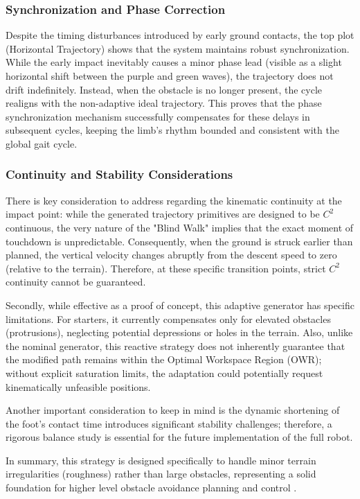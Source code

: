 \subsubsection{Synchronization and Phase Correction}

Despite the timing disturbances introduced by early ground contacts, the top plot (Horizontal Trajectory) shows
that the system maintains robust synchronization. While the early impact inevitably causes a minor phase lead
(visible as a slight horizontal shift between the purple and green waves), the trajectory does not drift
indefinitely. Instead, when the obstacle is no longer present, the cycle realigns with the non-adaptive ideal
trajectory. This proves that the phase synchronization mechanism successfully compensates for these delays in
subsequent cycles, keeping the limb's rhythm bounded and consistent with the global gait cycle.


\subsubsection{Continuity and Stability Considerations}

There is key consideration to address regarding the kinematic continuity at the impact point: while the
generated trajectory primitives are designed to be $C^2$ continuous, the very nature of the "Blind Walk"
implies that the exact moment of touchdown is unpredictable. Consequently, when the ground is struck earlier
than planned, the vertical velocity changes abruptly from the descent speed to zero (relative to the terrain).
Therefore, at these specific transition points, strict $C^2$ continuity cannot be guaranteed.

Secondly, while effective as a proof of concept, this adaptive generator has specific limitations. For starters,
it currently compensates only for elevated obstacles (protrusions), neglecting potential depressions or holes
in the terrain. Also, unlike the nominal generator, this reactive strategy does not inherently guarantee that
the modified path remains within the Optimal Workspace Region (OWR); without explicit saturation limits, the
adaptation could potentially request kinematically unfeasible positions.

Another important consideration to keep in mind is the dynamic shortening of the foot's contact time introduces
significant stability challenges; therefore, a rigorous balance study is essential for the future implementation
of the full robot.

In summary, this strategy is designed specifically to handle minor terrain irregularities (roughness) rather
than large obstacles, representing a solid foundation for higher level obstacle avoidance planning and control
\cite{saranli2001rhex}.